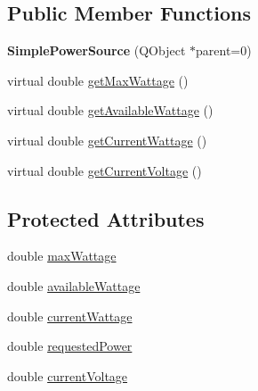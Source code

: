 \subsection*{Public Member Functions}
\begin{DoxyCompactItemize}
\item 
\hypertarget{class_challenger604_systems_1_1_simple_power_source_aed200c8ab5c16b1f16126c6060ec9e71}{{\bfseries Simple\-Power\-Source} (Q\-Object $\ast$parent=0)}\label{class_challenger604_systems_1_1_simple_power_source_aed200c8ab5c16b1f16126c6060ec9e71}

\item 
virtual double \hyperlink{class_challenger604_systems_1_1_simple_power_source_a377f887867cacb82d212ead69271e734}{get\-Max\-Wattage} ()
\item 
virtual double \hyperlink{class_challenger604_systems_1_1_simple_power_source_afc499fcf88b5da279ba0e335df95b816}{get\-Available\-Wattage} ()
\item 
virtual double \hyperlink{class_challenger604_systems_1_1_simple_power_source_a8474beaf3067db8ffd1579c6363f5721}{get\-Current\-Wattage} ()
\item 
virtual double \hyperlink{class_challenger604_systems_1_1_simple_power_source_a6bb0e0f7759b88801749afa8a462d6db}{get\-Current\-Voltage} ()
\end{DoxyCompactItemize}
\subsection*{Protected Attributes}
\begin{DoxyCompactItemize}
\item 
double \hyperlink{class_challenger604_systems_1_1_simple_power_source_a5fb4dd72e0d2a30293f91e9be9eb6e97}{max\-Wattage}
\item 
double \hyperlink{class_challenger604_systems_1_1_simple_power_source_a4a74a3aadb987bae076113afbe9cec49}{available\-Wattage}
\item 
double \hyperlink{class_challenger604_systems_1_1_simple_power_source_a4cf363de2167ac9b478febb6e49c4866}{current\-Wattage}
\item 
double \hyperlink{class_challenger604_systems_1_1_simple_power_source_af9ee729a686825c87e59c55622b64659}{requested\-Power}
\item 
double \hyperlink{class_challenger604_systems_1_1_simple_power_source_a06714fe17da09f4552da8a8766617032}{current\-Voltage}
\end{DoxyCompactItemize}


